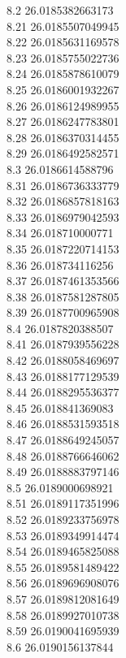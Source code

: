 {8.2	26.0185382663173\\
8.21	26.0185507049945\\
8.22	26.0185631169578\\
8.23	26.0185755022736\\
8.24	26.0185878610079\\
8.25	26.0186001932267\\
8.26	26.0186124989955\\
8.27	26.0186247783801\\
8.28	26.0186370314455\\
8.29	26.0186492582571\\
8.3	26.0186614588796\\
8.31	26.0186736333779\\
8.32	26.0186857818163\\
8.33	26.0186979042593\\
8.34	26.018710000771\\
8.35	26.0187220714153\\
8.36	26.018734116256\\
8.37	26.0187461353566\\
8.38	26.0187581287805\\
8.39	26.0187700965908\\
8.4	26.0187820388507\\
8.41	26.0187939556228\\
8.42	26.0188058469697\\
8.43	26.0188177129539\\
8.44	26.0188295536377\\
8.45	26.018841369083\\
8.46	26.0188531593518\\
8.47	26.0188649245057\\
8.48	26.0188766646062\\
8.49	26.0188883797146\\
8.5	26.0189000698921\\
8.51	26.0189117351996\\
8.52	26.0189233756978\\
8.53	26.0189349914474\\
8.54	26.0189465825088\\
8.55	26.0189581489422\\
8.56	26.0189696908076\\
8.57	26.0189812081649\\
8.58	26.0189927010738\\
8.59	26.0190041695939\\
8.6	26.0190156137844\\
}
